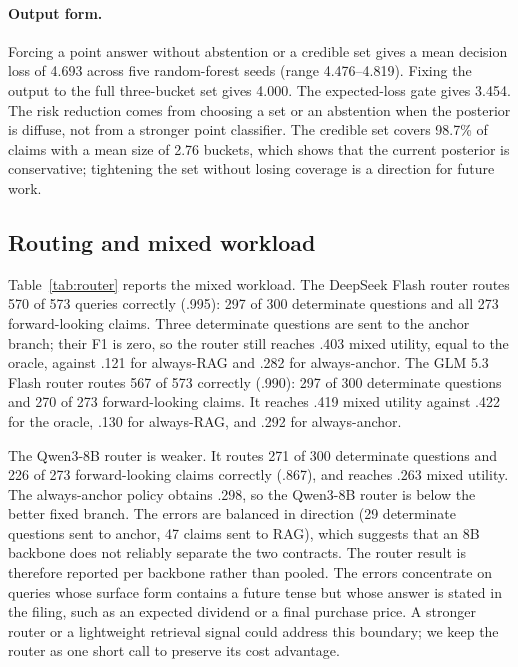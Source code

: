 \documentclass[11pt]{article}
\begin{document}
\paragraph{Output form.}
Forcing a point answer without abstention or a credible set gives a mean decision loss of 4.693 across five random-forest seeds (range 4.476--4.819). Fixing the output to the full three-bucket set gives 4.000. The expected-loss gate gives 3.454. The risk reduction comes from choosing a set or an abstention when the posterior is diffuse, not from a stronger point classifier. The credible set covers 98.7\% of claims with a mean size of 2.76 buckets, which shows that the current posterior is conservative; tightening the set without losing coverage is a direction for future work.

\subsection{Routing and mixed workload}
Table~\ref{tab:router} reports the mixed workload. The DeepSeek Flash router routes 570 of 573 queries correctly (.995): 297 of 300 determinate questions and all 273 forward-looking claims. Three determinate questions are sent to the anchor branch; their F1 is zero, so the router still reaches .403 mixed utility, equal to the oracle, against .121 for always-RAG and .282 for always-anchor. The GLM 5.3 Flash router routes 567 of 573 correctly (.990): 297 of 300 determinate questions and 270 of 273 forward-looking claims. It reaches .419 mixed utility against .422 for the oracle, .130 for always-RAG, and .292 for always-anchor.

The Qwen3-8B router is weaker. It routes 271 of 300 determinate questions and 226 of 273 forward-looking claims correctly (.867), and reaches .263 mixed utility. The always-anchor policy obtains .298, so the Qwen3-8B router is below the better fixed branch. The errors are balanced in direction (29 determinate questions sent to anchor, 47 claims sent to RAG), which suggests that an 8B backbone does not reliably separate the two contracts. The router result is therefore reported per backbone rather than pooled. The errors concentrate on queries whose surface form contains a future tense but whose answer is stated in the filing, such as an expected dividend or a final purchase price. A stronger router or a lightweight retrieval signal could address this boundary; we keep the router as one short call to preserve its cost advantage.


\end{document}
